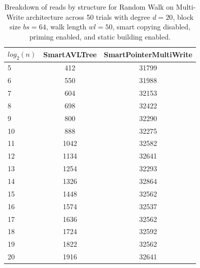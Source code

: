 \begin{table}[]
\centering
\begin{tabular}{|l|c|c|}
$log_2(n)$ & SmartAVLTree & SmartPointerMultiWrite \\ \hline
5 & 412 & 31799 \\ \hline
6 & 550 & 31988 \\ \hline
7 & 604 & 32153 \\ \hline
8 & 698 & 32422 \\ \hline
9 & 800 & 32290 \\ \hline
10 & 888 & 32275 \\ \hline
11 & 1042 & 32582 \\ \hline
12 & 1134 & 32641 \\ \hline
13 & 1254 & 32293 \\ \hline
14 & 1326 & 32864 \\ \hline
15 & 1448 & 32562 \\ \hline
16 & 1574 & 32537 \\ \hline
17 & 1636 & 32562 \\ \hline
18 & 1724 & 32592 \\ \hline
19 & 1822 & 32562 \\ \hline
20 & 1916 & 32641 \\ \hline
\end{tabular}
\caption{Breakdown of reads by structure for Random Walk on Multi-Write architecture across 50 trials with degree $d=20$, block size $bs=64$, walk length $wl=50$, smart copying disabled, priming enabled, and static building enabled.}
    \label{tab:reads_by_structure_rw_d20_bs64_trials50_copiesfalse_primetrue_staticinsertiontrue_wl50_ptmultiwrite_movetrue}
\end{table}

